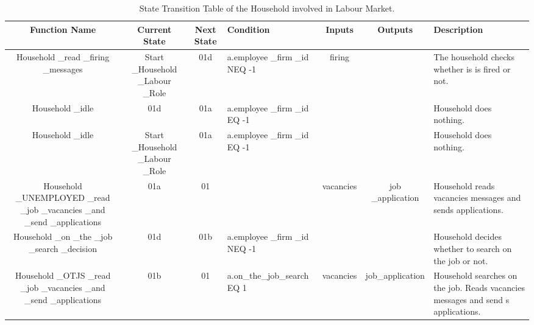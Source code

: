 \begin{landscape}
\begin{table}[!htb]\caption{State Transition Table of the Household involved in Labour Market.}
\begin{center}
\begin{tabular}{|c|c|c|l|c|c|l|}
\hline
Function Name & Current State & Next State & Condition & Inputs & Outputs & Description \\
\hline

{\parbox[l]{3cm}{Household \_read \_firing \_messages}}&
{\parbox[l]{3cm}{Start \_Household \_Labour \_Role}}&
{\parbox[l]{3cm}{01d}}&{\parbox[l]{3cm}{a.employee \_firm \_id NEQ
-1}}
 & {\parbox[l]{3cm}{firing}}& &{\parbox[l]{3cm}{The household checks whether is is fired or
 not.}}
\\
\hline

{\parbox[l]{3cm}{Household \_idle}}& {\parbox[l]{3cm}{01d}}&
{\parbox[l]{3cm}{01a}}& {\parbox[l]{3cm}{a.employee \_firm \_id EQ
-1}}& & &
{\parbox[l]{3cm}{Household does nothing.}}\\
\hline


{\parbox[l]{3cm}{Household \_idle}}& {\parbox[l]{3cm}{Start
\_Household \_Labour \_Role}}& {\parbox[l]{3cm}{01a}}&
{\parbox[l]{3cm}{a.employee \_firm \_id EQ -1}}& & &
{\parbox[l]{3cm}{Household does nothing.}}\\
\hline



{\parbox[l]{3cm}{Household \_UNEMPLOYED \_read \_job \_vacancies
\_and \_send \_applications}}& {\parbox[l]{3cm}{01a}}&
{\parbox[l]{3cm}{01}}& & {\parbox[l]{3cm}{vacancies}}
 &{\parbox[l]{3cm}{job \_application}} & {\parbox[l]{3cm}{Household reads vacancies messages and sends applications.}}
\\
\hline

{\parbox[l]{3cm}{Household \_on \_the \_job \_search \_decision}}&
{\parbox[l]{3cm}{01d}}&
{\parbox[l]{3cm}{01b}}&{\parbox[l]{3cm}{a.employee \_firm \_id NEQ
-1}}
 & & &{\parbox[l]{3cm}{Household decides whether to search on the job or not.}}
\\
\hline

{\parbox[l]{3cm}{Household \_OTJS \_read \_job \_vacancies \_and
\_send \_applications}}& {\parbox[l]{3cm}{01b}}&
{\parbox[l]{3cm}{01}}&{\parbox[l]{3cm}{a.on\_the\_job\_search EQ
1}}&{\parbox[l]{3cm}{vacancies}}&
{\parbox[l]{3cm}{job\_application}}&{\parbox[l]{3cm}{Household
searches on the job. Reads vacancies messages and send s
applications.}}
\\
\hline



\end{tabular}
\end{center}
\end{table}
\end{landscape}
